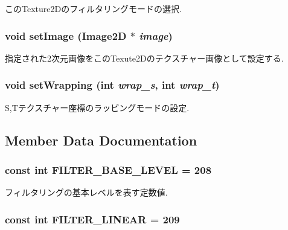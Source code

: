 このTexture2Dのフィルタリングモードの選択. \hypertarget{classm3g_1_1Texture2D_705b89b41cd1b38f664ed912be44baaa}{
\subsubsection[{setImage}]{\setlength{\rightskip}{0pt plus 5cm}void setImage ({\bf Image2D} $\ast$ {\em image})}}
\label{classm3g_1_1Texture2D_705b89b41cd1b38f664ed912be44baaa}


指定された2次元画像をこのTexute2Dのテクスチャー画像として設定する. \hypertarget{classm3g_1_1Texture2D_e676f34bd2f5ee1508ad1cb771702d8f}{
\subsubsection[{setWrapping}]{\setlength{\rightskip}{0pt plus 5cm}void setWrapping (int {\em wrap\_\-s}, \/  int {\em wrap\_\-t})}}
\label{classm3g_1_1Texture2D_e676f34bd2f5ee1508ad1cb771702d8f}


S,Tテクスチャー座標のラッピングモードの設定. 

\subsection{Member Data Documentation}
\hypertarget{classm3g_1_1Texture2D_d1924d32385b5353ad11ecd8b1ec0ad5}{
\subsubsection[{FILTER\_\-BASE\_\-LEVEL}]{\setlength{\rightskip}{0pt plus 5cm}const int {\bf FILTER\_\-BASE\_\-LEVEL} = 208}}
\label{classm3g_1_1Texture2D_d1924d32385b5353ad11ecd8b1ec0ad5}


フィルタリングの基本レベルを表す定数値. \hypertarget{classm3g_1_1Texture2D_5f06003f50141919a3665d22f55602a8}{
\subsubsection[{FILTER\_\-LINEAR}]{\setlength{\rightskip}{0pt plus 5cm}const int {\bf FILTER\_\-LINEAR} = 209}}
\label{classm3g_1_1Texture2D_5f06003f50141919a3665d22f55602a8}


